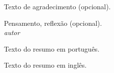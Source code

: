 \documentclass[a4paper,12pt,oneside,onecolumn,final,fleqn]{repUERJ}
\begin{document}
Texto de agradecimento (opcional).



\pretextualchapter{}
  \vfill
  \begin{flushright}
 Pensamento, reflexão (opcional). \\  %
    \textit{autor}
  \end{flushright}





Texto do resumo em português.


\imprimirchaves %




Texto do resumo em inglês.


\printkeys %


\listadefiguras    %
\listadetabelas    %


\listadealgoritmos %

\end{document}
